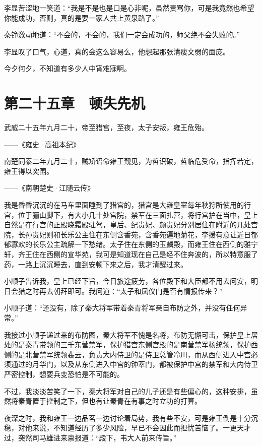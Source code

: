 李显苦涩地一笑道：“我是不是也是口是心非呢，虽然责骂你，可是我竟然也希望你能成功，否则，真的是要一家人共上黄泉路了。”

秦铮激动地道：“不会的，不会的，我们一定会成功的，师父绝不会失败的。”

李显叹了口气，心道，真的会这么容易么，他想起那张清瘦文弱的面庞。

今夕何夕，不知道有多少人中宵难寐啊。

\chapter{第二十五章　顿失先机}

武威二十五年九月二十，帝至猎宫，至夜，太子安叛，雍王危殆。

——《雍史·高祖本纪》

南楚同泰二年九月二十，贼矫诏命雍王觐见，为哲识破，哲临危受命，指挥若定，雍王得以突围。

——《南朝楚史·江随云传》

我是昏昏沉沉的在马车里面睡到了猎宫的，猎宫是大雍皇室每年秋狩所使用的行宫，位于骊山脚下，有大小几十处宫院，禁军在三面扎营，将行宫护在当中，皇上自然是在行宫的正殿晓霜殿驻驾，皇后、纪贵妃、颜贵妃分别居住在附近的几处宫院，长孙贵妃则和长乐公主住在东侧含香苑，含香苑遍地菊花，李援有意让近日郁郁寡欢的长乐公主疏解一下愁绪。太子住在东侧的玉麟殿，而雍王住在西侧的雅宁轩，齐王住在西侧的宣华苑，我可是知道现在自己是经不住奔波的，所以特意服了药，一路上沉沉睡去，直到安顿下来之后，我才清醒过来。

小顺子告诉我，皇上已经下旨，今日旅途疲劳，各位殿下和大臣都不用去问安，明日会猎之时再去朝拜即可。我问道：“太子和凤仪门是否有情报传来？”

小顺子道：“还没有，除了秦大将军带着秦青将军亲自布防之外，并没有任何异常。”

我接过小顺子递过来的布防图，秦大将军不愧是名将，布防无懈可击，保护皇上居处的是秦青带领的三千东营禁军，保护猎宫东侧宫殿的是南营禁军杨统领，保护西侧的是北营禁军统领裴云，负责大内侍卫的是侍卫总管冷川，而从西侧进入中宫必须通过的月华门，以及从东侧进入中宫的钟萃门，都被保护中宫的禁军和大内侍卫严密控制，想要兵变恐怕是不可能的。

不过，我淡淡苦笑了一下，秦大将军对自己的儿子还是有些偏心的，这种安排，虽然将秦青置于控制之下，但也有让秦青在有事之时立功的打算。

夜深之时，我和雍王一边品茗一边讨论着局势，我有些不安，可是雍王倒是十分沉稳，对他来说，不知道经历了多少风险，早已不会因此而担忧苦恼了。一更天才过，突然司马雄进来禀报道：“殿下，韦大人前来传旨。”


